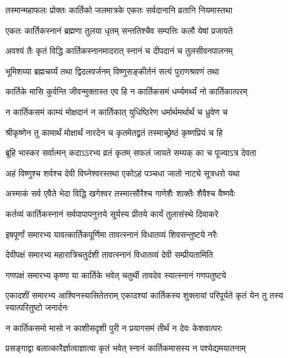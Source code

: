 \twolineshloka
{तस्मान्महाफलः प्रोक्तः कार्तिको जलमात्रके}
{एकतः सर्वदानानि व्रतानि नियमास्तथा} %

\twolineshloka
{एकतः कार्तिकस्नानं ब्रह्मणा तुलया धृतम्}
{सन्ततिश्चैव सम्पत्तिः कलौ येषां प्रजायते} %

\twolineshloka
{अवश्यं तैः कृतं विद्धि कार्तिकस्नानमादरात्}
{स्नानं च दीपदानं च तुलसीवनपालनम्} %

\twolineshloka
{भूमिशय्या ब्रह्मचर्य्यं तथा द्विदलवर्जनम्}
{विष्णुसङ्कीर्तनं सत्यं पुराणश्रवणं तथा} %

\twolineshloka
{कार्तिके मासि कुर्वन्ति जीवन्मुक्तास्त एव हि}
{न कार्तिकसमं धर्म्यमर्थ्यं नो कार्तिकात्परम्} %

\twolineshloka
{न कार्तिकसमं काम्यं मोक्षदानं न कार्तिकात्}
{युधिष्ठिरेण धर्मार्थमर्थार्थं च ध्रुवेण च} %

\twolineshloka
{श्रीकृष्णेन तु कामार्थं मोक्षार्थं नारदेन च}
{कृतमेतद्व्रतं तस्माच्छ्रेष्ठं कृष्णप्रियं च हि} %


\twolineshloka
{ब्रूहि भास्कर सर्वात्मन् कदाऽऽरभ्य व्रतं कृतम्}
{सफलं जायते सम्यक् का च पूज्याऽत्र देवता} %


\twolineshloka
{अहं विष्णुश्च शर्वश्च देवी विघ्नेश्वरस्तथा}
{एकोऽहं पञ्चधा जातो नाट्ये सूत्रधरो यथा} %

\twolineshloka
{अस्माकं सर्व एवैते भेदा विद्धि खगेश्वर}
{तस्मात्सौरैश्च गाणेशैः शाक्तैः शैवैश्च वैष्णवैः} %

\twolineshloka
{कर्तव्यं कार्तिकस्नानं सर्वपापापनुत्तये}
{सूर्यस्य प्रीतये कार्यं तुलासंस्थे दिवाकरे} %

\twolineshloka
{इषपूर्णां समारभ्य यावत्कार्तिकपूर्णिमा}
{तावत्स्नानं विधातव्यं शिवसन्तुष्टये नरैः} %

\twolineshloka
{देवीपक्षं समारभ्य महारात्रिचतुर्दशी}
{तावत्स्नानं विधातव्यं देवी सम्प्रीयतामिति} %

\twolineshloka
{गणपक्षं समारभ्य कृष्णा या कार्तिके भवेत्}
{चतुर्थी तावदेव स्यात्स्नानं गणपतुष्टये} %

\threelineshloka
{एकादशीं समारभ्य आश्विनस्यासितेतराम्}
{एकादश्यां कार्तिकस्य शुक्लायां परिपूर्यते}
{कृतं येन तु तस्य स्यात्परितुष्टो जनार्दनः} %

\twolineshloka
{न कार्तिकसमो मासो न काशीसदृशी पुरी}
{न प्रयागसमं तीर्थं न देवः केशवात्परः} %

\twolineshloka
{प्रसङ्गाद्वा बलात्कारैर्ज्ञात्वाज्ञात्वा कृतं भवेत्}
{स्नानं कार्तिकमासस्य न पश्येद्यमयातनाम्} %

